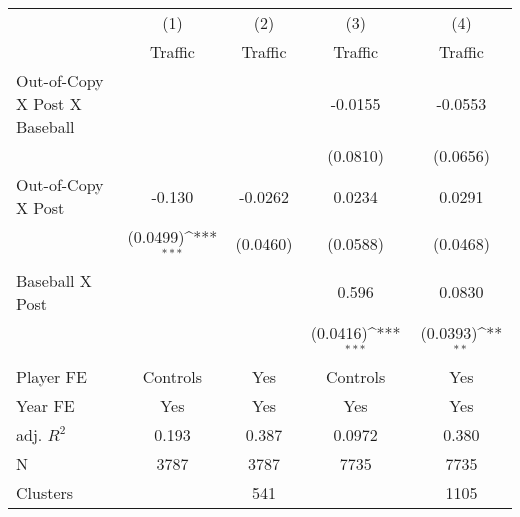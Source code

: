 {
\def\sym#1{\ifmmode^{#1}\else\(^{#1}\)\fi}
\begin{tabular*}{\hsize}{@{\hskip\tabcolsep\extracolsep\fill}l*{4}{c}}
\toprule
            &\multicolumn{1}{c}{(1)}&\multicolumn{1}{c}{(2)}&\multicolumn{1}{c}{(3)}&\multicolumn{1}{c}{(4)}\\
            &\multicolumn{1}{c}{Traffic}&\multicolumn{1}{c}{Traffic}&\multicolumn{1}{c}{Traffic}&\multicolumn{1}{c}{Traffic}\\
\midrule
Out-of-Copy X Post X Baseball&                     &                     &     -0.0155         &     -0.0553         \\
            &                     &                     &    (0.0810)         &    (0.0656)         \\
\addlinespace
Out-of-Copy X Post&      -0.130         &     -0.0262         &      0.0234         &      0.0291         \\
            &    (0.0499)\sym{***}&    (0.0460)         &    (0.0588)         &    (0.0468)         \\
\addlinespace
Baseball X Post&                     &                     &       0.596         &      0.0830         \\
            &                     &                     &    (0.0416)\sym{***}&    (0.0393)\sym{**} \\
\midrule
Player FE   &    Controls         &         Yes         &    Controls         &         Yes         \\
Year FE     &         Yes         &         Yes         &         Yes         &         Yes         \\
adj. $R^2$  &       0.193         &       0.387         &      0.0972         &       0.380         \\
N           &        3787         &        3787         &        7735         &        7735         \\
Clusters    &                     &         541         &                     &        1105         \\
\bottomrule
\end{tabular*}
}
